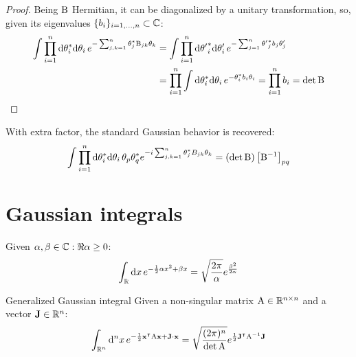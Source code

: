 \begin{proofbox}
  \begin{proof}
    Being $ \mathrm{B} $ Hermitian, it can be diagonalized by a unitary transformation, so, given its eigenvalues $ \{b_i\}_{i = 1,\dots,n} \subset \mathbb{C} $:
    \begin{equation*}
      \begin{split}
        \int \prod_{i = 1}^n \mathrm{d} \theta_i^* \mathrm{d} \theta_i\, e^{- \sum_{j,k = 1}^n \theta_j^* \mathrm{B}_{jk} \theta_k}
        & = \int \prod_{i = 1}^n \mathrm{d} {\theta'}^*_i \mathrm{d} \theta'_i\, e^{- \sum_{j = 1}^n {\theta'}^*_j b_j \theta'_j} \\
        & = \prod_{i = 1}^n \int \mathrm{d} \theta_i^* \mathrm{d} \theta_i\, e^{- \theta_i^* b_i \theta_i} = \prod_{i = 1}^n b_i = \det \mathrm{B}
      \end{split}
    \end{equation*}
  \end{proof}
\end{proofbox}

With extra factor, the standard Gaussian behavior is recovered:
\begin{equation}
  \int \prod_{i = 1}^n \mathrm{d} \theta_i^* \mathrm{d} \theta_i\, \theta_p \theta_q^* e^{-i \sum_{j,k = 1}^n \theta_j^* B_{jk} \theta_k} = \left( \det \mathrm{B} \right) \left[ \mathrm{B}^{-1} \right]_{pq}
  \label{eq:grass-gauss-2}
\end{equation}

\section{Gaussian integrals}

\begin{lemma}{}{}
  Given $ \alpha , \beta \in \mathbb{C} : \Re{\alpha} \ge 0 $:
  \begin{equation}
    \int_{\mathbb{R}} \mathrm{d} x\, e^{-\frac{1}{2} \alpha x^2 + \beta x} = \sqrt{\frac{2\pi}{\alpha}} e^{\frac{\beta^2}{2\alpha}}
    \label{eq:gauss-int}
  \end{equation}
\end{lemma}

\begin{proposition}{Generalized Gaussian integral}{}
  Given a non-singular matrix $ \mathrm{A} \in \mathbb{R}^{n \times n} $ and a vector $ \mathbf{J} \in \mathbb{R}^n $:
  \begin{equation}
    \int_{\mathbb{R}^n} \mathrm{d}^nx\, e^{-\frac{1}{2} \mathbf{x}^\intercal \mathrm{A} \mathbf{x} + \mathbf{J} \cdot \mathbf{x}} = \sqrt{\frac{(2\pi)^n}{\det\mathrm{A}}} e^{\frac{1}{2} \mathbf{J}^\intercal \mathrm{A}^{-1} \mathbf{J}}
  \end{equation}
\end{proposition}

